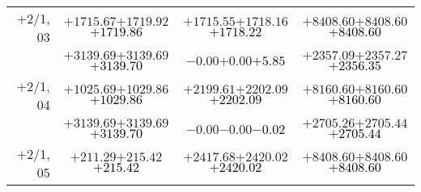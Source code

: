 \documentclass[compress]{beamer}
\begin{document}
\begin{frame}
{\begin{tabular}{r | c | c | c}
$+$2/1, 03 & $+1715.67$\hspace{0.1 cm}$+1719.92$\hspace{0.1 cm}\textcolor{black}{$+1719.86$} & $+1715.55$\hspace{0.1 cm}$+1718.16$\hspace{0.1 cm}\textcolor{black}{$+1718.22$} & $+8408.60$\hspace{0.1 cm}$+8408.60$\hspace{0.1 cm}\textcolor{black}{$+8408.60$} \\
           & $+3139.69$\hspace{0.1 cm}$+3139.69$\hspace{0.1 cm}\textcolor{black}{$+3139.70$} & $-0.00$\hspace{0.1 cm}$+0.00$\hspace{0.1 cm}\textcolor{black}{$+5.85$} & $+2357.09$\hspace{0.1 cm}$+2357.27$\hspace{0.1 cm}\textcolor{black}{$+2356.35$} \\
$+$2/1, 04 & $+1025.69$\hspace{0.1 cm}$+1029.86$\hspace{0.1 cm}\textcolor{black}{$+1029.86$} & $+2199.61$\hspace{0.1 cm}$+2202.09$\hspace{0.1 cm}\textcolor{black}{$+2202.09$} & $+8160.60$\hspace{0.1 cm}$+8160.60$\hspace{0.1 cm}\textcolor{black}{$+8160.60$} \\
           & $+3139.69$\hspace{0.1 cm}$+3139.69$\hspace{0.1 cm}\textcolor{black}{$+3139.70$} & $-0.00$\hspace{0.1 cm}$-0.00$\hspace{0.1 cm}\textcolor{black}{$-0.02$} & $+2705.26$\hspace{0.1 cm}$+2705.44$\hspace{0.1 cm}\textcolor{black}{$+2705.44$} \\
$+$2/1, 05 & $+211.29$\hspace{0.1 cm}$+215.42$\hspace{0.1 cm}\textcolor{black}{$+215.42$} & $+2417.68$\hspace{0.1 cm}$+2420.02$\hspace{0.1 cm}\textcolor{black}{$+2420.02$} & $+8408.60$\hspace{0.1 cm}$+8408.60$\hspace{0.1 cm}\textcolor{black}{$+8408.60$} \\

\end{tabular}}
\end{frame}
\end{document}
